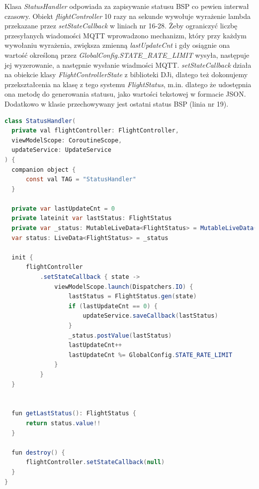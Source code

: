 Klasa \textit{StatusHandler} odpowiada za zapisywanie statusu BSP co pewien interwał czasowy. Obiekt \textit{flightController} 10 razy na sekunde wywołuje wyrażenie lambda przekazane przez \textit{setStateCallback} w liniach nr 16-28. Żeby ograniczyć liczbę przesyłanych wiadomości MQTT wprowadzono mechanizm, który przy każdym wywołaniu wyrażenia, zwiększa zmienną \textit{lastUpdateCnt} i gdy osiągnie ona wartość określoną przez \textit{GlobalConfig.STATE\_RATE\_LIMIT} wysyła, następuje jej wyzerowanie, a następnie wysłanie wiadmości MQTT. \textit{setStateCallback} działa na obiekcie klasy \textit{FlightControllerState} z biblioteki DJi, dlatego też dokonujemy przekształcenia na  klasę z tego systemu \textit{FlightStatus}, m.in. dlatego że udostępnia ona metodę do generowania statusu, jako wartości tekstowej w formacie JSON. Dodatkowo w klasie przechowywany jest ostatni status BSP (linia nr 19).

\begin{lstlisting}[language=Java, caption=Klasa \textit{StatusHandler}]
class StatusHandler(
  private val flightController: FlightController,
  viewModelScope: CoroutineScope,
  updateService: UpdateService
) {
  companion object {
      const val TAG = "StatusHandler"
  }

  private var lastUpdateCnt = 0
  private lateinit var lastStatus: FlightStatus
  private var _status: MutableLiveData<FlightStatus> = MutableLiveData()
  var status: LiveData<FlightStatus> = _status

  init {
      flightController
          .setStateCallback { state ->
              viewModelScope.launch(Dispatchers.IO) {
                  lastStatus = FlightStatus.gen(state)
                  if (lastUpdateCnt == 0) {
                      updateService.saveCallback(lastStatus)
                  }
                  _status.postValue(lastStatus)
                  lastUpdateCnt++
                  lastUpdateCnt %= GlobalConfig.STATE_RATE_LIMIT
              }
          }
  }


  fun getLastStatus(): FlightStatus {
      return status.value!!
  }

  fun destroy() {
      flightController.setStateCallback(null)
  }
}
\end{lstlisting}


